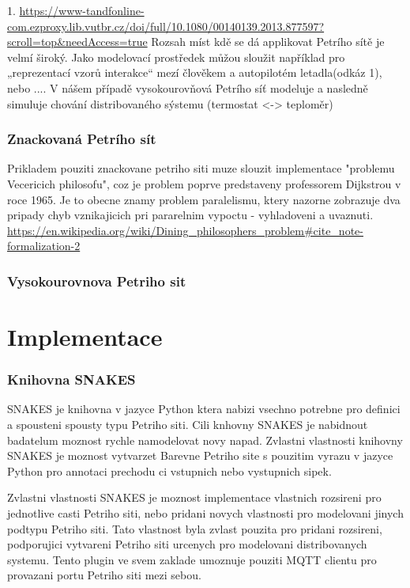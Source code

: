 1. \url{https://www-tandfonline-com.ezproxy.lib.vutbr.cz/doi/full/10.1080/00140139.2013.877597?scroll=top&needAccess=true}
Rozsah míst kdě se dá applikovat Petrího sítě je velmí široký. Jako modelovací prostředek můžou sloužit například pro „reprezentací vzorů interakce“ mezí člověkem a autopilotém letadla(odkáz 1), nebo .... V nášem případě vysokourovňová Petrího síť modeluje a nasledně simuluje chování distribovaného sýstemu (termostat <-> teploměr) 

\subsection*{Znackovaná Petrího sít}
Prikladem pouziti znackovane petriho siti muze slouzit implementace "problemu Vecericich philosofu", coz je problem poprve predstaveny professorem Dijkstrou v roce 1965.
Je to obecne znamy problem paralelismu, ktery nazorne zobrazuje dva pripady chyb vznikajicich pri pararelnim vypoctu - vyhladoveni a uvaznuti.
\url{https://en.wikipedia.org/wiki/Dining_philosophers_problem#cite_note-formalization-2}
\subsection*{Vysokourovnova Petriho sit}
\chapter{Implementace}
\subsection*{Knihovna SNAKES}
SNAKES je knihovna v jazyce Python ktera nabizi vsechno potrebne pro definici a spousteni spousty typu Petriho siti. Cili knhovny SNAKES je nabidnout badatelum moznost rychle namodelovat novy napad. Zvlastni vlastnosti knihovny SNAKES je moznost vytvarzet Barevne Petriho site s pouzitim vyrazu v jazyce Python pro annotaci prechodu ci vstupnich nebo vystupnich sipek.

Zvlastni vlastnosti SNAKES je moznost implementace vlastnich rozsireni pro jednotlive casti Petriho siti, nebo pridani novych vlastnosti pro modelovani jinych podtypu Petriho siti. Tato vlastnost byla zvlast pouzita pro pridani rozsireni, podporujici vytvareni Petriho siti urcenych pro modelovani distribovanych systemu.
Tento plugin ve svem zaklade umoznuje pouziti MQTT clientu pro provazani portu Petriho siti mezi sebou.
